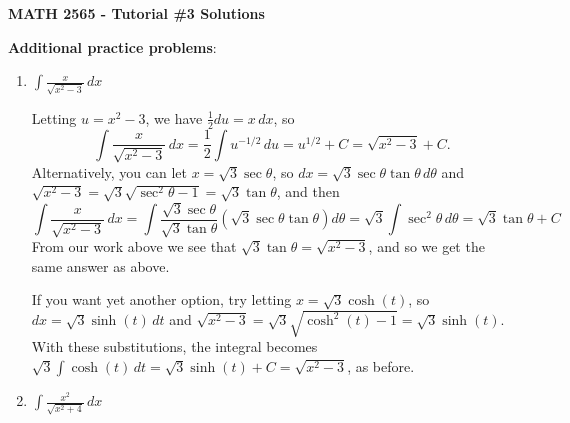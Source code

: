 \documentclass[12pt]{article}
\newcommand{\di}{\displaystyle}
\begin{document}
\author{Instructor: Sean Fitzpatrick}
\thispagestyle{empty}
\begin{center}
{\bf MATH 2565 - Tutorial \#3 Solutions}\\

\end{center}

\textbf{Additional practice problems}:

\begin{enumerate}
 \item $\di \int \frac{x}{\sqrt{x^2-3}}\,dx$

\medskip

Letting $u=x^2-3$, we have $\frac{1}{2}du = x\,dx$, so
\[
 \int\frac{x}{\sqrt{x^2-3}}\,dx = \frac{1}{2}\int u^{-1/2}\,du = u^{1/2}+C = \sqrt{x^2-3}+C.
\]
Alternatively, you can let $x=\sqrt{3}\sec\theta$, so $dx = \sqrt{3}\sec\theta\tan\theta\,d\theta$ and $\sqrt{x^2-3} = \sqrt{3}\sqrt{\sec^2\theta-1} = \sqrt{3}\tan\theta$, and then
\[
 \int\frac{x}{\sqrt{x^2-3}}\,dx = \int \frac{\sqrt{3}\sec\theta}{\sqrt{3}\tan\theta}(\sqrt{3}\sec\theta\tan\theta)d\theta = \sqrt{3}\int\sec^2\theta\,d\theta = \sqrt{3}\tan\theta+C
\]
From our work above we see that $\sqrt{3}\tan\theta = \sqrt{x^2-3}$, and so we get the same answer as above.

If you want yet another option, try letting $x=\sqrt{3}\cosh(t)$, so $dx = \sqrt{3}\sinh(t)\,dt$ and $\sqrt{x^2-3} = \sqrt{3}\sqrt{\cosh^2(t)-1} = \sqrt{3}\sinh(t)$. With these substitutions, the integral becomes $\di \sqrt{3}\int\cosh(t)\,dt = \sqrt{3}\sinh(t)+C = \sqrt{x^2-3}$, as before. 


 \item $\di \int \frac{x^2}{\sqrt{x^2+4}}\,dx$
 
 \medskip
 

\end{enumerate}
\end{document}
